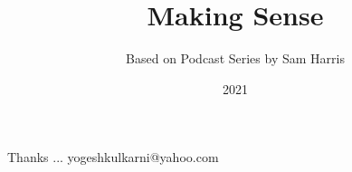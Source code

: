 \documentclass[xcolor=dvipsnames,compress,t,pdf]{beamer}
\title[Making Sense\hspace{4cm} \insertframenumber /\inserttotalframenumber]
{Making Sense}
\subtitle[]{Based on Podcast Series by Sam Harris}
\date{2021}
\begin{document}
\begin{frame}
\titlepage
\end{frame}




\begin{frame}[c]{}
Thanks ...
\vspace{5mm}
yogeshkulkarni@yahoo.com
\end{frame}
\end{document}

